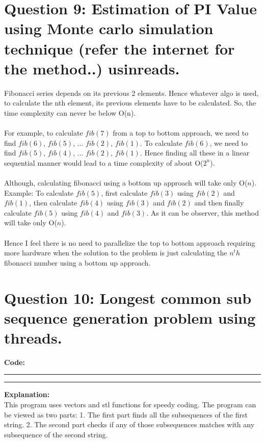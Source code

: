 \documentclass{article}
\begin{document}
\section*{Question 9: Estimation of PI Value using Monte carlo simulation technique (refer the internet for the
method..) usinreads.}
\bigskip

Fibonacci series depends on its previous 2 elements. Hence 
whatever algo is used, to calculate the nth element, 
its previous elements have to be calculated. So, the time complexity 
can never be below O(n). \\
\\For example, to calculate $fib(7)$ from a top to bottom approach, 
we need to find $fib(6)$, $fib(5)$, ... $fib(2)$, $fib(1)$. To calculate 
$fib(6)$, we need to find $fib(5)$, $fib(4)$, ... $fib(2)$, $fib(1)$. Hence
finding all these in a linear sequential manner would lead to a 
time complexity of about O($2^n$). \\
\\Although, calculating fibonacci using a bottom up approach will take
only O($n$). \\Example: To calculate $fib(5)$, first calculate $fib(3)$
using $fib(2)$ and $fib(1)$, then calculate $fib(4)$
using $fib(3)$ and $fib(2)$ and then finally calculate $fib(5)$
using $fib(4)$ and $fib(3)$. As it can be observer, this method will take only O($n$).\\
\\Hence I feel there is no need to parallelize the top to bottom approach
requiring more hardware when the solution to the problem is just calculating
the $n^th$ fibonacci number using a bottom up approach.


\section*{Question 10: Longest common sub sequence generation problem using threads.}
\bigskip

\par\noindent
\textbf{\Large Code: }
\smallskip
\par\noindent\rule{\textwidth}{0.4pt}

\par\noindent\rule{\textwidth}{0.4pt}

\bigskip
\noindent
\textbf{\Large Explanation: } \\

This program uses vectors and stl functions for speedy coding.
The program can be viewed as two parts:
1.  The first part finds all the subsequences of the first string.
2.  The second part checks if any of those subsequences matches with any subsequence of the second string.
\end{document}
